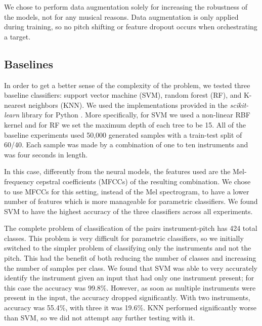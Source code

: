 \documentclass[runningheads,a4paper]{llncs}
\begin{document}
We chose to perform data augmentation solely for increasing the robustness of the models, not for any musical reasons. Data augmentation is only applied during training, so no pitch shifting or feature dropout occurs when orchestrating a target.

\subsection{Baselines}
\label{sec:baseline}

In order to get a better sense of the complexity of the problem, we tested three baseline classifiers: support vector machine (SVM), random forest (RF), and K-nearest neighbors (KNN). We used the implementations provided in the \emph{scikit-learn }library for Python \cite{scikit-learn}. More specifically, for SVM we used a non-linear RBF kernel and for RF we set the maximum depth of each tree to be 15.  All of the baseline experiments used 50,000 generated samples with a train-test split of 60/40. Each sample was made by a combination of one to ten instruments and was four seconds in length.

In this case, differently from the neural models, the features used are the Mel-frequency cepstral coefficients (MFCCs) of the resulting combination. We chose to use MFCCs for this setting, instead of the Mel spectrogram, to have a lower number of features which is more manageable for parametric classifiers. We found SVM to have the highest accuracy of the three classifiers across all experiments.

The complete problem of classification of the pairs instrument-pitch has 424 total classes. This problem is very difficult for parametric classifiers, so we initially switched to the simpler problem of classifying only the instruments and not the pitch. This had the benefit of both reducing the number of classes and increasing the number of samples per class. We found that SVM was able to very accurately identify the instrument given an input that had only one instrument present; for this case the accuracy was 99.8\%. However, as soon as multiple instruments were present in the input, the accuracy dropped significantly. With two instruments, accuracy was 55.4\%, with three it was 19.6\%. KNN performed significantly worse than SVM, so we did not attempt any further testing with it.
\end{document}
